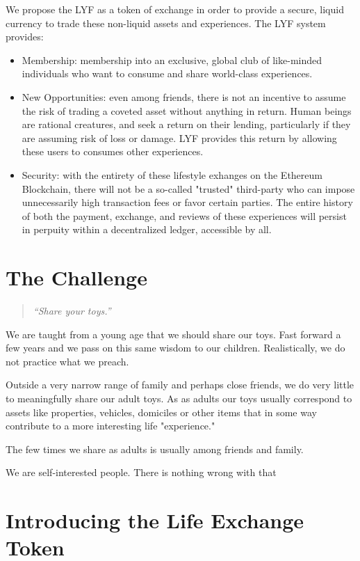 \documentclass[11pt]{article}
\begin{document}
We propose the \textrm{LYF} as a token of exchange in order to provide a secure, liquid currency to trade these non-liquid assets and experiences. The \textrm{LYF} system provides: 
\begin{itemize}
\item{Membership: membership into an exclusive, global club of like-minded individuals who want to consume and share world-class experiences. }
\item{New Opportunities: even among friends, there is not an incentive to assume the risk of trading a coveted asset without anything in return. Human beings are rational creatures, and seek a return on their lending, particularly if they are assuming risk of loss or damage. LYF provides this return by allowing these users to consumes other experiences. }
\item{Security: with the entirety of these lifestyle exhanges on the Ethereum Blockchain, there will not be a so-called "trusted" third-party who can impose unnecessarily high transaction fees or favor certain parties. The entire history of both the payment, exchange, and reviews of these experiences will persist in perpuity within a decentralized ledger, accessible by all.}
\end{itemize}
\section{The Challenge}
\label{sec-3}

\begin{quote}
\textit{``Share your toys.''}
\end{quote}
We are taught from a young age that we should share our toys. Fast forward a few years and we pass on this same wisdom to our children. Realistically, we do not practice what we preach.

Outside a very narrow range of family and perhaps close friends, we do very little to meaningfully share our adult toys. As as adults our toys usually correspond to assets like properties, vehicles, domiciles or other items that in some way contribute to a more interesting life "experience."

The few times we share as adults is usually among friends and family.

We are self-interested people. There is nothing wrong with that 
\section{Introducing the Life Exchange Token}
\label{sec-4}
\end{document}
